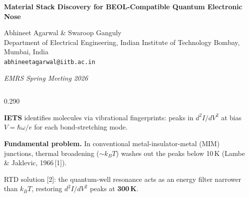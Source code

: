 \documentclass[final]{beamer}
\begin{document}
\begin{frame}[t]{}
\vspace{-6pt}

\begin{tcolorbox}[
  enhanced, colback=navyblue, colframe=navyblue,
  arc=0pt, boxrule=0pt,
  left=28pt, right=28pt, top=16pt, bottom=14pt,
]
{\color{white}\bfseries\fontsize{44}{54}\selectfont
  Material Stack Discovery for BEOL-Compatible Quantum Electronic Nose
}\par\vspace{10pt}
{\color{lightblue}
  Abhineet Agarwal \&
  Swaroop Ganguly \\[4pt]
  \normalsize Department of Electrical Engineering,
  Indian Institute of Technology Bombay, Mumbai, India\\
  \texttt{abhineetagarwal@iitb.ac.in}
}\par\vspace{6pt}
{\color{white}\normalsize
  \textit{EMRS Spring Meeting 2026}
}
\end{tcolorbox}

\vspace{10pt}

\begin{columns}[T]

\begin{column}{0.290\textwidth}

\begin{tcolorbox}[posterbox,
  title={Motivation: Room-Temperature IETS}]
\justifying\small

\textbf{IETS} identifies molecules via vibrational fingerprints:
peaks in $d^2I/dV^2$ at bias $V = \hbar\omega/e$ for each
bond-stretching mode.

\vspace{8pt}
\textbf{Fundamental problem.} In conventional metal-insulator-metal
(MIM) junctions, thermal broadening (${\sim}k_BT$) washes out the
peaks below 10\,K (Lambe \& Jaklevic, 1966\,[1]).

\vspace{8pt}
\begin{tcolorbox}[callout]
  RTD solution [2]: the quantum-well resonance acts as an
  energy filter narrower than $k_BT$, restoring
  $d^2I/dV^2$ peaks at \textbf{300\,K}.
\end{tcolorbox}


\end{tcolorbox}
\end{column}
\end{columns}
\end{frame}
\end{document}
